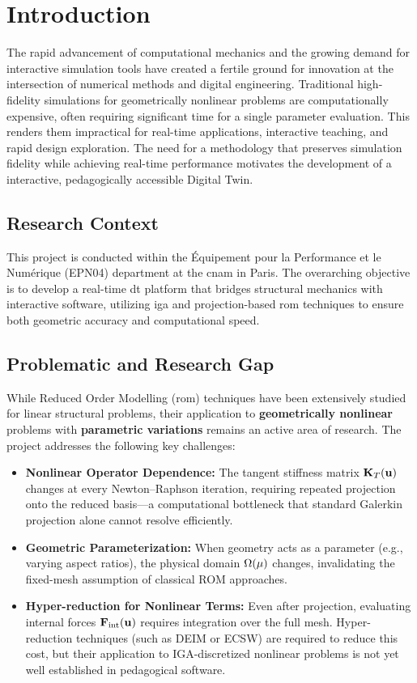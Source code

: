 \section{Introduction}
\label{sec:introduction}

The rapid advancement of computational mechanics and the growing demand for interactive simulation tools have created a fertile ground for innovation at the intersection of numerical methods and digital engineering. Traditional high-fidelity simulations for geometrically nonlinear problems are computationally expensive, often requiring significant time for a single parameter evaluation. This renders them impractical for real-time applications, interactive teaching, and rapid design exploration. The need for a methodology that preserves simulation fidelity while achieving real-time performance motivates the development of a interactive, pedagogically accessible Digital Twin.

\subsection{Research Context}
This project is conducted within the Équipement pour la Performance et le Numérique (EPN04) department at the \acrlong{cnam} in Paris. The overarching objective is to develop a real-time \acrfull{dt} platform that bridges structural mechanics with interactive software, utilizing \acrfull{iga} and projection-based \acrfull{rom} techniques to ensure both geometric accuracy and computational speed.

\subsection{Problematic and Research Gap}
While Reduced Order Modelling (\acrlong{rom}) techniques have been extensively studied for linear structural problems, their application to \textbf{geometrically nonlinear} problems with \textbf{parametric variations} remains an active area of research. The project addresses the following key challenges:
\begin{itemize}
    \item \textbf{Nonlinear Operator Dependence:} The tangent stiffness matrix $\mathbf{K}_T(\mathbf{u})$ changes at every Newton--Raphson iteration, requiring repeated projection onto the reduced basis—a computational bottleneck that standard Galerkin projection alone cannot resolve efficiently.
    \item \textbf{Geometric Parameterization:} When geometry acts as a parameter (e.g., varying aspect ratios), the physical domain $\Omega(\mathbf{\mu})$ changes, invalidating the fixed-mesh assumption of classical ROM approaches.
    \item \textbf{Hyper-reduction for Nonlinear Terms:} Even after projection, evaluating internal forces $\mathbf{F}_{\text{int}}(\mathbf{u})$ requires integration over the full mesh. Hyper-reduction techniques (such as DEIM or ECSW) are required to reduce this cost, but their application to IGA-discretized nonlinear problems is not yet well established in pedagogical software.
\end{itemize}

